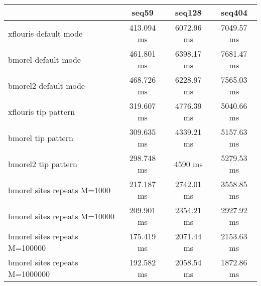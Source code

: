 \begin{tabular}{|l|c|c|c|}
\hline
 & seq59 & seq128 & seq404 \\
\hline
xflouris default mode & 413.094 ms & 6072.96 ms & 7049.57 ms\\
\hline
bmorel default mode & 461.801 ms & 6398.17 ms & 7681.47 ms\\
\hline
bmorel2 default mode & 468.726 ms & 6228.97 ms & 7565.03 ms\\
\hline
xflouris tip pattern & 319.607 ms & 4776.39 ms & 5040.66 ms\\
\hline
bmorel tip pattern & 309.635 ms & 4339.21 ms & 5157.63 ms\\
\hline
bmorel2 tip pattern & 298.748 ms & 4590 ms & 5279.53 ms\\
\hline
bmorel sites repeats M=1000 & 217.187 ms & 2742.01 ms & 3558.85 ms\\
\hline
bmorel sites repeats M=10000 & 209.901 ms & 2354.21 ms & 2927.92 ms\\
\hline
bmorel sites repeats M=100000 & 175.419 ms & 2071.44 ms & 2153.63 ms\\
\hline
bmorel sites repeats M=1000000 & 192.582 ms & 2058.54 ms & 1872.86 ms\\
\hline
\end{tabular}
